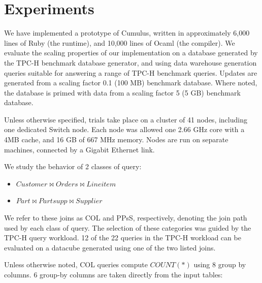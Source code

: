 
\section{Experiments}
\label{sec:experiments}

We have implemented a prototype of Cumulus, written in approximately 6,000 lines of Ruby (the runtime), and 10,000 lines of Ocaml (the compiler).  We evaluate the scaling properties of our implementation on a database generated by the TPC-H benchmark database generator, and using data warehouse generation queries suitable for answering a range of TPC-H benchmark queries.  Updates are generated from a scaling factor 0.1 (100 MB) benchmark database.  Where noted, the database is primed with data from a scaling factor 5 (5 GB) benchmark database.

Unless otherwise specified, trials take place on a cluster of 41 nodes, including one dedicated Switch node.  Each node was allowed one 2.66 GHz core with a 4MB cache, and 16 GB of 667 MHz memory.  Nodes are run on separate machines, connected by a Gigabit Ethernet link.  %

We study the behavior of 2 classes of query: 
\begin{itemize}
\item $Customer \bowtie Orders \bowtie Lineitem$
\item $Part \bowtie Partsupp \bowtie Supplier$
\end{itemize}
We refer to these joins as COL and PPsS, respectively, denoting the join path used by each class of query.  The selection of these categories was guided by the TPC-H query workload.  12 of the 22 queries in the TPC-H workload can be evaluated on a datacube generated using one of the two listed joins.  

Unless otherwise noted, COL queries compute $COUNT(*)$ using 8 group by columns.  6 group-by columns are taken directly from the input tables: 

